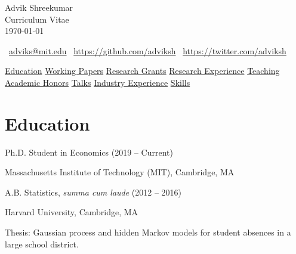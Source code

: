 \documentclass[12pt]{article}
\begin{document}
\begin{center}
{ \sectionfont
  { \huge Advik Shreekumar } \\
  \vspace{0.3cm}
  { \large Curriculum Vitae } \\
  \today
}
\end{center}

\begin{center}
{
  \latofont
  \faEnvelope \, \href{mailto:adviks@mit.edu}{adviks@mit.edu}
  \quad
  \faGithub   \, \href{https://github.com/adviksh}{https://github.com/adviksh}
  \quad
  \faTwitter  \, \href{https://twitter.com/AdvikSh}{https://twitter.com/adviksh}
}
\end{center}

\begin{center}
{
  \sectionfont
  \hyperref[sec:education]{Education} \quad
  \hyperref[sec:working_papers]{Working Papers} \quad
  \hyperref[sec:research_grants]{Research Grants} \quad
  \hyperref[sec:research_experience]{Research Experience} \quad
  \hyperref[sec:teaching]{Teaching} \\
  \vspace{0.1cm}
  \hyperref[sec:academic_honors]{Academic Honors} \quad
  \hyperref[sec:talks]{Talks} \quad
  \hyperref[sec:industry_experience]{Industry Experience} \quad
  \hyperref[sec:skills]{Skills} \quad
}
\end{center}

\section*{Education}
\label{sec:education}

Ph.D. Student in Economics (2019 – Current)
\begin{addmargin}[1em]{2em}
Massachusetts Institute of Technology (MIT), Cambridge, MA
\end{addmargin}

A.B. Statistics, \emph{summa cum laude} (2012 – 2016)
\begin{addmargin}[1em]{2em}
Harvard University, Cambridge, MA

Thesis: Gaussian process and hidden Markov models for student absences in a large school district.
\end{addmargin}
\end{document}
